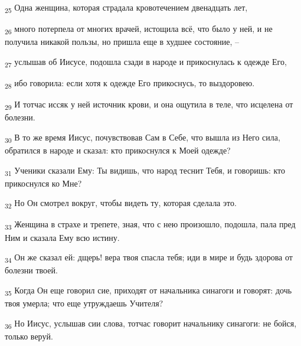 \begin{tcolorbox}
\textsubscript{25} Одна женщина, которая страдала кровотечением двенадцать лет,
\end{tcolorbox}
\begin{tcolorbox}
\textsubscript{26} много потерпела от многих врачей, истощила всё, что было у ней, и не получила никакой пользы, но пришла еще в худшее состояние, --
\end{tcolorbox}
\begin{tcolorbox}
\textsubscript{27} услышав об Иисусе, подошла сзади в народе и прикоснулась к одежде Его,
\end{tcolorbox}
\begin{tcolorbox}
\textsubscript{28} ибо говорила: если хотя к одежде Его прикоснусь, то выздоровею.
\end{tcolorbox}
\begin{tcolorbox}
\textsubscript{29} И тотчас иссяк у ней источник крови, и она ощутила в теле, что исцелена от болезни.
\end{tcolorbox}
\begin{tcolorbox}
\textsubscript{30} В то же время Иисус, почувствовав Сам в Себе, что вышла из Него сила, обратился в народе и сказал: кто прикоснулся к Моей одежде?
\end{tcolorbox}
\begin{tcolorbox}
\textsubscript{31} Ученики сказали Ему: Ты видишь, что народ теснит Тебя, и говоришь: кто прикоснулся ко Мне?
\end{tcolorbox}
\begin{tcolorbox}
\textsubscript{32} Но Он смотрел вокруг, чтобы видеть ту, которая сделала это.
\end{tcolorbox}
\begin{tcolorbox}
\textsubscript{33} Женщина в страхе и трепете, зная, что с нею произошло, подошла, пала пред Ним и сказала Ему всю истину.
\end{tcolorbox}
\begin{tcolorbox}
\textsubscript{34} Он же сказал ей: дщерь! вера твоя спасла тебя; иди в мире и будь здорова от болезни твоей.
\end{tcolorbox}
\begin{tcolorbox}
\textsubscript{35} Когда Он еще говорил сие, приходят от начальника синагоги и говорят: дочь твоя умерла; что еще утруждаешь Учителя?
\end{tcolorbox}
\begin{tcolorbox}
\textsubscript{36} Но Иисус, услышав сии слова, тотчас говорит начальнику синагоги: не бойся, только веруй.
\end{tcolorbox}
